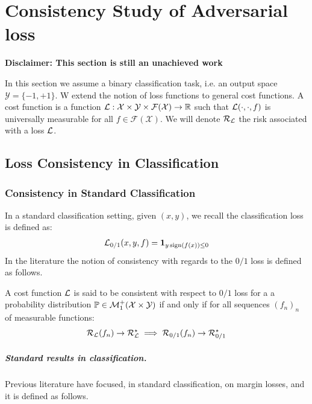 \chapter{Consistency Study of Adversarial loss}
\label{chap:calibration}

\minitoc
\textbf{Disclaimer: This section is still an unachieved work}

In this section we assume a binary classification task, i.e. an output space $\mathcal{Y}=\{-1,+1\}$. W extend the notion of loss functions to general cost functions.  A cost function is a function $\mathcal{L}:\mathcal{X}\times\mathcal{Y}\times \mathcal{F}(\mathcal{X})\to \mathbb{R}$ such that $\mathcal{L}(\cdot,\cdot,f)$ is universally measurable for all $f\in\mathcal{F}(\mathcal{X})$. We will denote $\mathcal{R}_{\mathcal{L}}$ the risk associated with a loss $\mathcal{L}$. 


\section{Loss Consistency in Classification}

\subsection{Consistency in Standard Classification}
In a standard classification setting,  given $(x,y)$, we recall  the classification loss is defined as:
\begin{align*}
    \mathcal{L}_{0/1}(x,y,f) = \mathbf{1}_{y\operatorname*{sign}(f(x))\leq 0}
\end{align*}
In the literature the notion of consistency with regards to the $0/1$ loss is defined as follows.
\begin{definition}
A cost function $\mathcal{L}$ is said to be consistent with respect to $0/1$ loss for a a probability distribution $\mathbb{P}\in\mathcal{M}_1^+(\mathcal{X}\times\mathcal{Y})$ if and only if for all sequences $(f_n)_n $ of measurable functions:
\begin{align}
    \mathcal{R}_{\mathcal{L}}(f_n)\to \mathcal{R}_{\mathcal{L}}^\star\implies\mathcal{R}_{0/1}(f_n)\to \mathcal{R}_{0/1}^\star
\end{align}
\end{definition}


\paragraph{Standard results in classification.} Previous literature have focused, in standard classification, on margin losses, and it is defined as follows.

